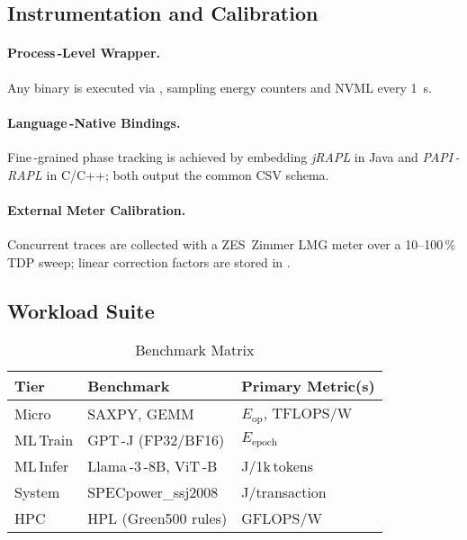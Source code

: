 \subsection{Instrumentation and Calibration}
\label{sec:energy:instr}
\paragraph{Process\,-Level Wrapper.} Any binary is executed via , sampling \sysfs energy counters and NVML every \SI{1}{\second}.

\paragraph{Language\,-Native Bindings.} Fine\,-grained phase tracking is achieved by embedding \emph{jRAPL} in Java and \emph{PAPI\,-RAPL} in C/C++; both output the common CSV schema.

\paragraph{External Meter Calibration.} Concurrent traces are collected with a ZES~Zimmer LMG meter over a 10–100\,\% TDP sweep; linear correction factors are stored in .

\subsection{Workload Suite}
\label{sec:energy:workload}
\begin{table}[tb]
\centering
\caption{Benchmark Matrix}
\begin{tabular}{lll}
\toprule
\textbf{Tier} & \textbf{Benchmark} & \textbf{Primary Metric(s)} \\
\midrule
Micro   & SAXPY, GEMM            & $E_{\text{op}}$, TFLOPS/W \\
ML\,Train & GPT\,-J (FP32/BF16)    & $E_{\text{epoch}}$ \\
ML\,Infer & Llama\,-3\,-8B, ViT\,-B & J/1k\,tokens \\
System  & SPECpower\_ssj2008     & J/transaction \\
HPC     & HPL (Green500 rules)   & GFLOPS/W \\
\bottomrule
\end{tabular}
\label{tab:benchmark_matrix}
\end{table}

